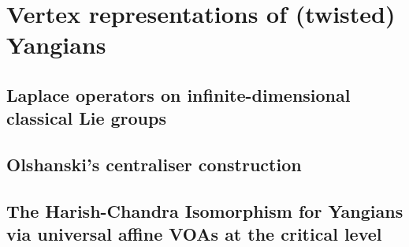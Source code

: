 \section{Vertex representations of (twisted) Yangians}
    \subsection{Laplace operators on infinite-dimensional classical Lie groups}

    \subsection{Olshanski's centraliser construction}

    \subsection{The Harish-Chandra Isomorphism for Yangians via universal affine VOAs at the critical level}